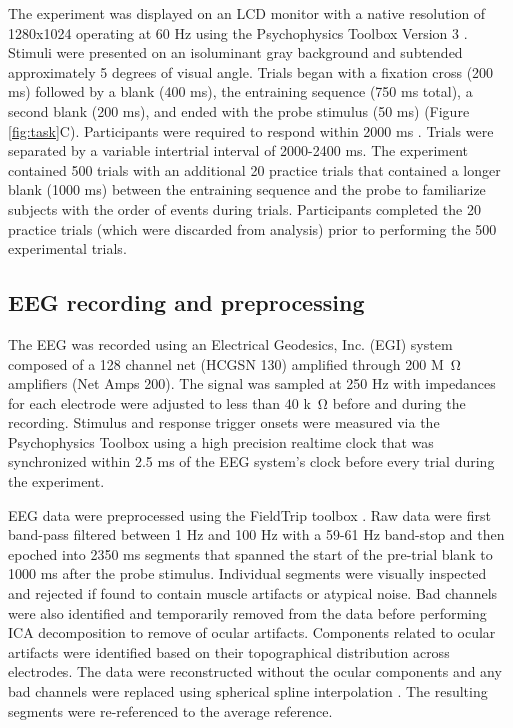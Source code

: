 \documentclass[dwyatte_dissertation.tex]{subfiles}
\begin{document}
The experiment was displayed on an LCD monitor with a native resolution of 1280x1024 operating at 60 Hz using the Psychophysics Toolbox Version 3 \cite{Brainard97,Pelli97}. Stimuli were presented on an isoluminant gray background and subtended approximately 5 degrees of visual angle. Trials began with a fixation cross (200 ms) followed by a blank (400 ms), the entraining sequence (750 ms total), a second blank (200 ms), and ended with the probe stimulus (50 ms) (Figure \ref{fig:task}C). Participants were required to respond within 2000 ms . Trials were separated by a variable intertrial interval of 2000-2400 ms. The experiment contained 500 trials with an additional 20 practice trials that contained a longer blank (1000 ms) between the entraining sequence and the probe to familiarize subjects with the order of events during trials. Participants completed the 20 practice trials (which were discarded from analysis) prior to performing the 500 experimental trials. %

\subsection{EEG recording and preprocessing}
The EEG was recorded using an Electrical Geodesics, Inc. (EGI) system composed of a 128 channel net (HCGSN 130) amplified through 200 M\SI{}{\ohm} amplifiers (Net Amps 200). The signal was sampled at 250 Hz with impedances for each electrode were adjusted to less than 40 k\SI{}{\ohm} before and during the recording. Stimulus and response trigger onsets were measured via the Psychophysics Toolbox using a high precision realtime clock that was synchronized within 2.5 ms of the EEG system's clock before every trial during the experiment.

EEG data were preprocessed using the FieldTrip toolbox \cite{OostenveldFriesMarisEtAl11}. Raw data were first band-pass filtered between 1 Hz and 100 Hz with a 59-61 Hz band-stop and then epoched into 2350 ms segments that spanned the start of the pre-trial blank to 1000 ms after the probe stimulus. Individual segments were visually inspected and rejected if found to contain muscle artifacts or atypical noise. Bad channels were also identified and temporarily removed from the data before performing ICA decomposition \cite{DelormeMakeig04} to remove of ocular artifacts. Components related to ocular artifacts were identified based on their topographical distribution across electrodes. The data were reconstructed without the ocular components and any bad channels were replaced using spherical spline interpolation \cite{PerrinPernierBertrandEtAl89}. The resulting segments were re-referenced to the average reference.
\end{document}
